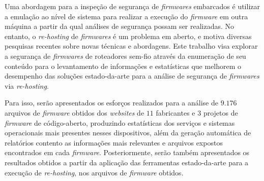 
Uma abordagem para a inspeção de segurança de \textit{firmwares} embarcados é utilizar a emulação ao nível de sistema para realizar a execução do \textit{firmware} em outra máquina a partir da qual análises de segurança possam ser realizadas. No entanto, o \textit{re-hosting} de \textit{firmwares} é um problema em aberto, e motiva diversas pesquisas recentes sobre novas técnicas e abordagens. Este trabalho visa explorar a segurança de \textit{firmwares} de roteadores sem-fio através da enumeração de seu conteúdo para o levantamento de informações e estatísticas que melhorem o desempenho das soluções estado-da-arte para a análise de segurança de \textit{firmwares} via \textit{re-hosting}.

Para isso, serão apresentados os esforços realizados para a análise de $9.176$ arquivos de \textit{firmware} obtidos dos \textit{websites} de $11$ fabricantes e $3$ projetos de \textit{firmware} de código-aberto, produzindo estatísticas dos serviços e sistemas operacionais mais presentes nesses dispositivos, além da geração automática de relatórios contento as informações mais relevantes e arquivos expostos encontrados em cada \textit{firmware}. Posteriormente, serão também apresentados os resultados obtidos a partir da aplicação das ferramentas estado-da-arte para a execução de \textit{re-hosting}, nos arquivos de \textit{firmware} obtidos.